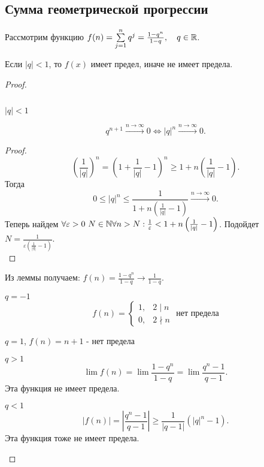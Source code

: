\documentclass[12pt]{report}
\begin{document}
\subsection{Сумма геометрической прогрессии}\label{ques_24}
Рассмотрим функцию $f(n) = \sum\limits_{j=1}^n q^j = \frac{1-q^n}{1-q}, \quad q \in \mathbb{R}$.
\begin{st}
    Если $|q| < 1$, то $f(x)$ имеет предел, иначе не имеет предела.
\end{st}
\begin{proof}
    \begin{enumerate}$ $
        \item $|q| < 1$ \\
	    {\begin{lm}
	    \[
		q^{n+1} \stackrel{n \to  \infty } \longrightarrow 0 \Longleftrightarrow |q|^n\stackrel{n \to  \infty } \longrightarrow 0 
	   .\] 
	    \end{lm}
	    \begin{proof}
		\[
		    \left (\frac{1}{|q|} \right)^n = \left(1 + \frac{1}{|q|} -1\right)^n \ge 1 +n \left(\frac{1}{|q|}-1\right)
		.\]
		Тогда \[
		    0 \le |q|^n \le \frac{1}{1+n \left(\frac{1}{|q|} -1 \right)} \stackrel{n \to  \infty } \longrightarrow 0
		.\]  
		Теперь найдем $\forall \varepsilon>0 ~N \in \mathbb{N} \forall n > N: \frac{1}{\varepsilon } < 1 + n \left(\frac{1}{|q|} -1 \right)$. Подойдет $N = \frac{1}{\varepsilon \left(\frac{1}{|q|}-1 \right)}$. \\
	    \end{proof}
	    Из леммы получаем:
	    $f(n) = \frac{1-q^n}{1-q} \longrightarrow \frac{1}{1-q}$. 
	\item $q=- 1$  \[
		f(n) = \left \{ 
		    \begin{array}{ll}
			1 ,& 2 \mid n \\
			0  ,& 2 \nmid n
		    \end{array}
		    \right . \mbox{ нет предела}
	    \]  }
    \item $q = 1$,  $f(n) = n+1$ - нет предела
    \item $q > 1$ \\
	\[
	    \lim f(n) = \lim \frac{1 - q^n}{1 - q} = \lim \frac{q^n-1}{q-1} 
	.\] 
	Эта функция не имеет предела.
    \item $q < 1$ \\
	\[
	    |f(n) | = |\frac{q^n-1}{q-1}| \ge  \frac{1}{|q-1|}(|q|^n -1)
	.\] 
	Эта функция тоже не имеет предела.
    \end{enumerate}
\end{proof}
\end{document}
